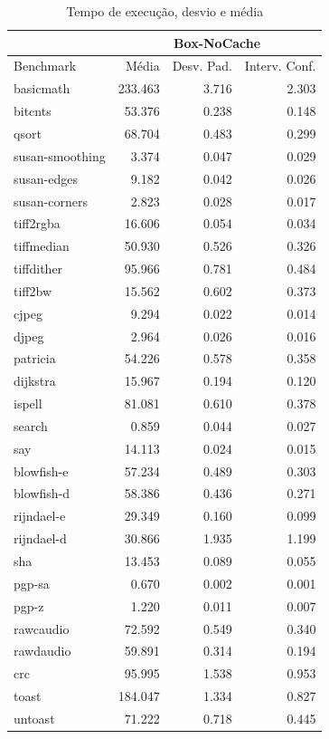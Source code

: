 \documentclass[11pt,twoside]{article}
\begin{document}
\begin{table}
 \caption{Tempo de execução, desvio e média}
 \begin{center}
 \begin{tabular}{|l|r|r|r|}
   \cline{2-4}
   \multicolumn{1}{c|}{}& \multicolumn{3}{|c|}{Box-NoCache} \\ \hline
   Benchmark & Média & Desv. Pad. & Interv. Conf.\\ \hline 
   basicmath & 233.463 & 3.716 & 2.303\\ \hline 
   bitcnts & 53.376 & 0.238 & 0.148\\ \hline 
   qsort & 68.704 & 0.483 & 0.299\\ \hline 
   susan-smoothing & 3.374 & 0.047 & 0.029\\ \hline 
   susan-edges & 9.182 & 0.042 & 0.026\\ \hline 
   susan-corners & 2.823 & 0.028 & 0.017\\ \hline 
   tiff2rgba & 16.606 & 0.054 & 0.034\\ \hline 
   tiffmedian & 50.930 & 0.526 & 0.326\\ \hline 
   tiffdither & 95.966 & 0.781 & 0.484\\ \hline 
   tiff2bw & 15.562 & 0.602 & 0.373\\ \hline 
   cjpeg & 9.294 & 0.022 & 0.014\\ \hline 
   djpeg & 2.964 & 0.026 & 0.016\\ \hline 
   patricia & 54.226 & 0.578 & 0.358\\ \hline 
   dijkstra & 15.967 & 0.194 & 0.120\\ \hline 
   ispell & 81.081 & 0.610 & 0.378\\ \hline 
   search & 0.859 & 0.044 & 0.027\\ \hline 
   say & 14.113 & 0.024 & 0.015\\ \hline 
   blowfish-e & 57.234 & 0.489 & 0.303\\ \hline 
   blowfish-d & 58.386 & 0.436 & 0.271\\ \hline 
   rijndael-e & 29.349 & 0.160 & 0.099\\ \hline 
   rijndael-d & 30.866 & 1.935 & 1.199\\ \hline 
   sha & 13.453 & 0.089 & 0.055\\ \hline 
   pgp-sa & 0.670 & 0.002 & 0.001\\ \hline 
   pgp-z & 1.220 & 0.011 & 0.007\\ \hline 
   rawcaudio & 72.592 & 0.549 & 0.340\\ \hline 
   rawdaudio & 59.891 & 0.314 & 0.194\\ \hline 
   crc & 95.995 & 1.538 & 0.953\\ \hline 
   toast & 184.047 & 1.334 & 0.827\\ \hline 
   untoast & 71.222 & 0.718 & 0.445\\
   \hline
  \end{tabular}
  \label{tab:tempos_boxnocache}
 \end{center}
\end{table}
 
\end{document}
